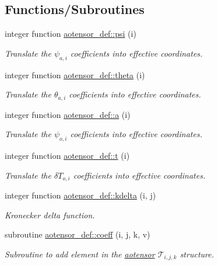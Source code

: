 \subsection*{Functions/\+Subroutines}
\begin{DoxyCompactItemize}
\item 
integer function \hyperlink{namespaceaotensor__def_afa05aa849a8cb9e08b36dee6560986b8}{aotensor\+\_\+def\+::psi} (i)
\begin{DoxyCompactList}\small\item\em Translate the $\psi_{a,i}$ coefficients into effective coordinates. \end{DoxyCompactList}\item 
integer function \hyperlink{namespaceaotensor__def_a506f7d7bc9671005e5ed9a403bb29394}{aotensor\+\_\+def\+::theta} (i)
\begin{DoxyCompactList}\small\item\em Translate the $\theta_{a,i}$ coefficients into effective coordinates. \end{DoxyCompactList}\item 
integer function \hyperlink{namespaceaotensor__def_abdb4d710d4614fef61179c46d8e26b8e}{aotensor\+\_\+def\+::a} (i)
\begin{DoxyCompactList}\small\item\em Translate the $\psi_{o,i}$ coefficients into effective coordinates. \end{DoxyCompactList}\item 
integer function \hyperlink{namespaceaotensor__def_aed72341f9a3de19b5e8c21fd27471ce6}{aotensor\+\_\+def\+::t} (i)
\begin{DoxyCompactList}\small\item\em Translate the $\delta T_{o,i}$ coefficients into effective coordinates. \end{DoxyCompactList}\item 
integer function \hyperlink{namespaceaotensor__def_a13eb91ac3a121fd77c1cf644021cff5b}{aotensor\+\_\+def\+::kdelta} (i, j)
\begin{DoxyCompactList}\small\item\em Kronecker delta function. \end{DoxyCompactList}\item 
subroutine \hyperlink{namespaceaotensor__def_a0da983fc262aa15a3fde0d6138825660}{aotensor\+\_\+def\+::coeff} (i, j, k, v)
\begin{DoxyCompactList}\small\item\em Subroutine to add element in the \hyperlink{namespaceaotensor__def_a0dc43bc9294a18f2fe57b67489f1702f}{aotensor} $\mathcal{T}_{i,j,k}$ structure. \end{DoxyCompactList}\item 

\end{DoxyCompactItemize}
